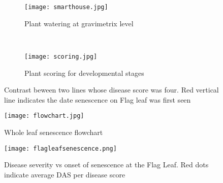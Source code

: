 \documentclass{frontiersSCNS} %
\begin{document}

\begin{figure}
    \begin{center}
    \begin{subfigure}[b]{0.5\textwidth}
        \texttt{[image: smarthouse.jpg]}
        \caption{Plant watering at gravimetrix level}
    \end{subfigure}
    ~ %
    \begin{subfigure}[b]{0.5\textwidth}
        \texttt{[image: scoring.jpg]}
        \caption{Plant scoring for developmental stages}
    \end{subfigure}
\end{center}
    \caption{Contrast beween two lines whose disease score was four. Red vertical line indicates the date senescence on Flag leaf was first seen}\label{fig3}
\end{figure}


\begin{figure}[h!]
\begin{center}
\texttt{[image: flowchart.jpg]}
\end{center}
 \caption{ Whole leaf senescence flowchart}\label{fig1:flowchart}
\end{figure}

\begin{figure}[h!]
\begin{center}
\texttt{[image: flagleafsenescence.png]}
\end{center}
 \caption{Disease severity vs onset of senescence at the Flag Leaf. Red dots indicate average DAS per disease score}\label{fig2}
\end{figure}
\end{document}
